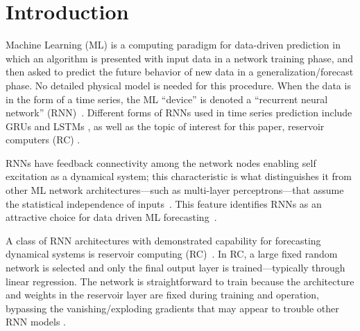\documentclass[12pt]{article}
\begin{document}


\section{Introduction}
Machine Learning (ML) is a computing paradigm for data-driven prediction in which an algorithm is presented with input data in a network training phase, and then asked to predict the future behavior of new data in a generalization/forecast phase.  No detailed physical model is needed for this procedure.  When the data is in the form of a time series, the ML ``device'' is denoted a ``recurrent neural network'' (RNN)~\cite{goodfellow16}.  Different forms of RNNs used in time series prediction include GRUs \cite{GRU14} and LSTMs \cite{LSTM97}, as well as the topic of interest for this paper, reservoir computers (RC) \cite{Jaeger01}.

RNNs have feedback connectivity among the network nodes enabling self excitation as a dynamical system; this characteristic is what distinguishes it from other ML network architectures---such as multi-layer perceptrons---that assume the statistical independence of inputs~\cite{Lipton15}.  This feature identifies RNNs as an attractive choice for data driven ML forecasting~\cite{Vlachas20}.

A class of RNN architectures with demonstrated capability for forecasting dynamical systems is reservoir computing (RC)~\cite{luk09,verstraten09,luko11,
Jaeger01, Jaeger12, Jaeger04, Schrauwen07, Maass02, Wojcik04,pathak18}. In RC, a large fixed random network is selected and only the final output layer is trained---typically through linear regression.  The network is straightforward to train because the architecture and weights in the reservoir layer are fixed during training and operation, bypassing the vanishing/exploding gradients that may appear to trouble other RNN models \cite{Hochreiter01,Bengio93,Pascanu13}.  
\end{document}
